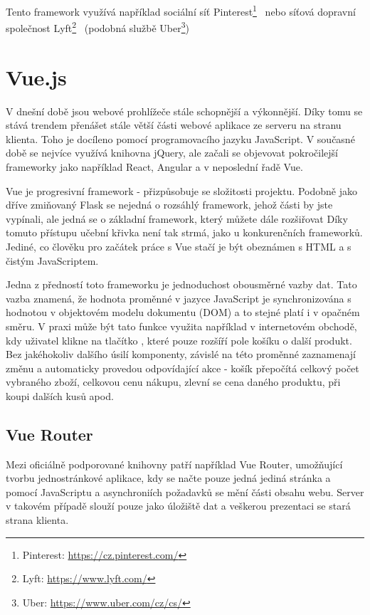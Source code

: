 Tento framework využívá například sociální síť Pinterest\footnote{Pinterest: \url{https://cz.pinterest.com/}}~\cite{bib:flask-pinterest}
nebo síťová dopravní společnost Lyft\footnote{Lyft: \url{https://www.lyft.com/}}~\cite{bib:flask-lyft} 
(podobná službě Uber\footnote{Uber: \url{https://www.uber.com/cz/cs/}})

\section{Vue.js}\label{section:Vue.js}
V dnešní době jsou webové prohlížeče stále schopnější a výkonnější. Díky tomu se stává trendem přenášet stále větší části webové aplikace ze serveru na stranu klienta. Toho je docíleno pomocí programovacího jazyku JavaScript. V současné době se nejvíce využívá knihovna jQuery, %
ale začali se objevovat pokročilejší frameworky jako například React, Angular a v neposlední řadě Vue.

Vue je progresivní framework - přizpůsobuje se složitosti projektu. Podobně jako dříve zmiňovaný Flask se nejedná o rozsáhlý framework, jehož části by jste vypínali, ale jedná se o základní framework, který můžete dále rozšiřovat %
Díky tomuto přístupu učební křivka není tak strmá, jako u konkurenčních frameworků. Jediné, co člověku pro začátek práce s Vue stačí je být obeznámen s HTML a s čistým JavaScriptem.  %

Jedna z předností toto frameworku je jednoduchost obousměrné vazby dat. Tato vazba znamená, že hodnota proměnné v jazyce JavaScript je synchronizována s hodnotou v objektovém modelu dokumentu (DOM) a to stejné platí i v opačném směru. %
V praxi může být tato funkce využita například v internetovém obchodě, kdy uživatel klikne na tlačítko , které pouze rozšíří pole košíku o další produkt. Bez jakéhokoliv dalšího úsilí komponenty, závislé na této proměnné zaznamenají změnu a automaticky provedou odpovídající akce - košík přepočítá celkový počet vybraného zboží, celkovou cenu nákupu, zlevní se cena daného produktu, při koupi dalších kusů apod. 

\subsection{Vue Router}
Mezi oficiálně podporované knihovny patří například Vue Router, umožňující tvorbu jednostránkové aplikace, kdy se načte pouze jedná jediná stránka a pomocí JavaScriptu a asynchroniích požadavků se mění části obsahu webu. Server v takovém případě slouží pouze jako úložiště dat a veškerou prezentaci se stará strana klienta. %

